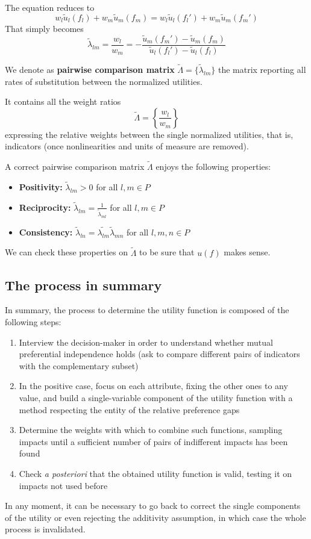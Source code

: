 The equation reduces to 
$$ w_l \tilde u_l (f_l) + w_m \tilde u_m (f_m) = w_l \tilde u_l (f_l') + w_m \tilde u_m (f_m') $$
That simply becomes
$$ \tilde \lambda_{lm} = \frac{w_l}{w_m} = - \frac{\tilde u_m (f_m') - \tilde u_m (f_m)}{\tilde u_l (f_l') - \tilde u_l (f_l)} $$

\begin{definition}
	We denote as \textbf{pairwise comparison matrix} $\tilde \Lambda = \{\tilde \lambda_{lm}\}$ the matrix reporting all rates of substitution between the normalized utilities.
\end{definition}

It contains all the weight ratios
$$ \tilde \Lambda = \left\{\frac{w_l}{w_m}\right\} $$
expressing the relative weights between the single normalized utilities, that is, indicators (once nonlinearities and units of measure are removed).

A correct pairwise comparison matrix $\tilde \Lambda$ enjoys the following properties:
\begin{itemize}
	\item \textbf{Positivity:} $\tilde \lambda_{lm} > 0$ for all $l,m \in P$
	
	\item \textbf{Reciprocity:} $\tilde \lambda_{lm} = \frac{1}{\tilde \lambda_{ml}}$ for all $l,m \in P$
	
	\item \textbf{Consistency:} $\tilde \lambda_{ln} = \tilde{ \lambda_{lm}} \tilde \lambda_{mn}$ for all $l,m,n \in P$
\end{itemize}
We can check these properties on $\tilde \Lambda$ to be sure that $u(f)$ makes sense.

\subsection{The process in summary}

In summary, the process to determine the utility function is composed of the following steps: 
\begin{enumerate}
	\item Interview the decision-maker in order to understand whether mutual preferential independence holds (ask to compare different pairs of indicators with the complementary subset)
	
	\item In the positive case, focus on each attribute, fixing the other ones to any value, and build a single-variable component of the utility function with a method respecting the entity of the relative preference gaps
	
	\item Determine the weights with which to combine such functions, sampling impacts until a sufficient number of pairs of indifferent impacts has been found
	
	\item Check \textit{a posteriori} that the obtained utility function is valid, testing it on impacts not used before
\end{enumerate}

In any moment, it can be necessary to go back to correct the single components of the utility or even rejecting the additivity assumption, in which case the whole process is invalidated.


